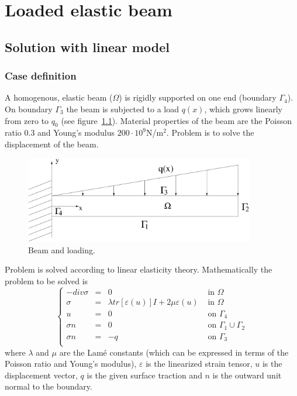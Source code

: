 \chapter{Loaded elastic beam}


\section{Solution with linear model} 



\subsection*{Case definition}

A homogenous, elastic beam ($\Omega$) is rigidly supported on one 
end (boundary $\Gamma_4$). On boundary $\Gamma_3$ the beam is subjected 
to a load $q(x)$, which grows linearly from zero to $q_0$ 
(see figure~\ref{fg:beam}). Material properties of the beam are the Poisson 
ratio 0.3 and Young's modulus $200\cdot 10^9$N/m$^2$. Problem is to solve the 
displacement of the beam.  

\begin{figure}[h]
\centering
\includegraphics[width=100mm]{Beam}
\caption{Beam and loading.}\label{fg:beam}
\end{figure}

Problem is solved according to linear elasticity theory. Mathematically 
the problem to be solved is
\begin{equation}
\left \{
\begin{array}{rcll}
-div \sigma & = & 0 & \mbox{ in } \Omega \\
\sigma & = & \lambda tr [\varepsilon(u)]I + 2 \mu \varepsilon(u) &
\mbox{ in } \Omega \\
u & = & 0 & \mbox{ on } \Gamma_4 \\
\sigma n & = & 0 & \mbox{ on } \Gamma_1 \cup \Gamma_2 \\
\sigma n & = & -q & \mbox{ on } \Gamma_3 \\
\end{array}
\right .
\end{equation}
where $\lambda$ and $\mu$ are the Lam\'{e} constants (which can be expressed 
in terms of the Poisson ratio and Young's modulus), $\varepsilon$ is the 
linearized strain tensor, $u$ is the displacement vector, $q$ is the given
surface traction and $n$ is the outward unit normal to the boundary.


